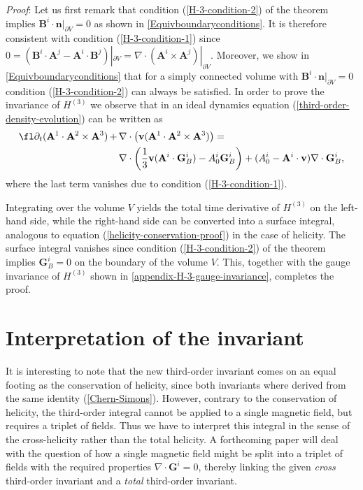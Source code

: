 \documentclass[10pt]{iopart}
\def \Eq{equation }
\def \p{{\partial}}
\def \bA{{\mathbf{A}}}
\def \bB{{\mathbf{B}}}
\def \bG{{\mathbf{G}}}
\def \bv{{\mathbf{v}}}
\def \bn{{\mathbf{n}}}
\begin{document}
\noindent



\noindent
{\em Proof}:
Let us first remark that
condition (\ref{H-3-condition-2}) of the theorem 
implies $\bB^i\cdot\bn|_{\p V}=0$ as shown in \ref{Equivboundaryconditions}.
It is  therefore consistent with condition 
(\ref{H-3-condition-1}) since 
$0 = (\bB^i\cdot\bA^j-\bA^i\cdot\bB^j)|_{\p V} 
   = \nabla\cdot(\bA^i\times\bA^j)|_{\p V} $.  
Moreover, we show in \ref{Equivboundaryconditions} that for a simply
connected volume with $\bB^i\cdot\bn|_{\p V}=0$ condition
(\ref{H-3-condition-2}) can always be satisfied.
In order to prove the invariance of $H^{(3)}$ we observe that in
an ideal dynamics \Eq (\ref{third-order-density-evolution}) can be written as
\begin{eqnarray}
  \fl\nonumber
   \p_t(\bA^1\cdot\bA^2\times\bA^3)
     \,+\, &\nabla\cdot\left( \bv(\bA^1\cdot\bA^2\times\bA^3) \right) =\\ 
       &\nabla\cdot\left( \frac{1}{3}\bv(\bA^i\cdot\bG_B^i)-A_0^i\bG_B^i\right)
       + (A_0^i-\bA^i\cdot\bv)\nabla\cdot\bG_B^i ,\nonumber
\end{eqnarray}
where the last term vanishes due to condition (\ref{H-3-condition-1}).

Integrating 
over the volume $V$ yields the total time
derivative of $H^{(3)}$ on the left-hand side,
while the right-hand side can be converted into a surface integral,
analogous to \Eq (\ref{helicity-conservation-proof}) in the case of helicity.
The surface integral vanishes since condition 
(\ref{H-3-condition-2}) of the theorem
implies $\bG_B^i=0$ on the boundary of the volume $V$.
This, together with the gauge invariance of $H^{(3)}$
shown in \ref{appendix-H-3-gauge-invariance},
completes the proof.







\section{Interpretation of the invariant}
It is interesting to note that the new 
third-order invariant comes on an equal footing as the
conservation of helicity, since both invariants where derived from
the same identity (\ref{Chern-Simons}).
However, contrary to the conservation of helicity, the third-order
integral cannot be applied to a single magnetic field,
but requires  a
triplet of fields. Thus we have to interpret this integral in the
sense of the cross-helicity rather than the total helicity.
A forthcoming paper will deal with the question of
how 
a single magnetic field 
might be split into
a triplet of
fields with the required properties $\nabla\cdot\bG^i=0$,  thereby
linking the given {\it cross} third-order invariant and  a {\it total} 
third-order invariant.
\end{document}
